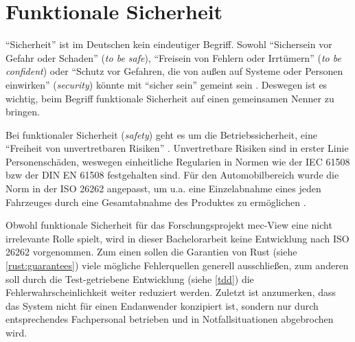 


\section{Funktionale Sicherheit}
\label{com:safety}

\enquote{Sicherheit} ist im Deutschen kein eindeutiger Begriff.
Sowohl \enquote{Sichersein vor Gefahr oder Schaden} (\textit{to be safe}), \enquote{Freisein von Fehlern oder Irrtümern} (\textit{to be confident}) oder \enquote{Schutz vor Gefahren, die von außen auf Systeme oder Personen einwirken} (\textit{security}) könnte mit \enquote{sicher sein} gemeint sein \cite[5-6]{safety}.
Deswegen ist es wichtig, beim Begriff funktionale Sicherheit auf einen gemeinsamen Nenner zu bringen.

Bei funktionaler Sicherheit (\textit{safety}) geht es um die Betriebssicherheit, eine \enquote{Freiheit von unvertretbaren Risiken} \cite[6]{safety}.
Unvertretbare Risiken sind in erster Linie Personenschäden, weswegen einheitliche Regularien in Normen wie der IEC 61508 bzw der DIN EN 61508 festgehalten sind.
Für den Automobilbereich wurde die Norm in der ISO 26262 angepasst, um u.a. eine Einzelabnahme eines jeden Fahrzeuges durch eine Gesamtabnahme des Produktes zu ermöglichen \cite[14]{safety}.

Obwohl funktionale Sicherheit für das Forschungsprojekt \gls{mec}-View eine nicht irrelevante Rolle spielt, wird in dieser Bachelorarbeit keine Entwicklung nach ISO 26262 vorgenommen.
Zum einen sollen die Garantien von Rust (siehe \autoref{rust:guarantees}) viele mögliche Fehlerquellen generell ausschließen, zum anderen soll durch die Test-getriebene Entwicklung (siehe \autoref{tdd}) die Fehlerwahrscheinlichkeit weiter reduziert werden.
Zuletzt ist anzumerken, dass das System nicht für einen Endanwender konzipiert ist, sondern nur durch entsprechendes Fachpersonal betrieben und in Notfallsituationen abgebrochen wird.

	
	
	
